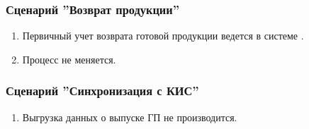 \subsubsection{Сценарий ''Возврат продукции''}
\label{bp:goods_6}

\begin{enumerate}

\item Первичный учет возврата готовой продукции ведется в системе \erp. 
\item Процесс не меняется.

\end{enumerate}


\subsubsection{Сценарий ''Синхронизация с КИС''}
\label{bp:goods_exchange}


\begin{enumerate}
\item Выгрузка данных о выпуске ГП не производится.




\end{enumerate}


